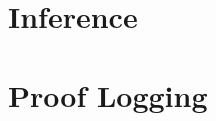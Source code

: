 \documentclass{beamer}
\begin{document}

\section{Inference}

\section{Proof Logging}
\end{document}
